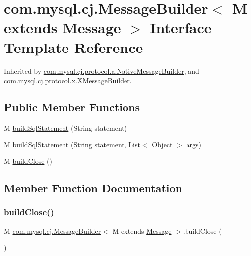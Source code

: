 \hypertarget{interfacecom_1_1mysql_1_1cj_1_1_message_builder}{}\section{com.\+mysql.\+cj.\+Message\+Builder$<$ M extends Message $>$ Interface Template Reference}
\label{interfacecom_1_1mysql_1_1cj_1_1_message_builder}


Inherited by \mbox{\hyperlink{classcom_1_1mysql_1_1cj_1_1protocol_1_1a_1_1_native_message_builder}{com.\+mysql.\+cj.\+protocol.\+a.\+Native\+Message\+Builder}}, and \mbox{\hyperlink{classcom_1_1mysql_1_1cj_1_1protocol_1_1x_1_1_x_message_builder}{com.\+mysql.\+cj.\+protocol.\+x.\+X\+Message\+Builder}}.

\subsection*{Public Member Functions}
\begin{DoxyCompactItemize}
\item 
M \mbox{\hyperlink{interfacecom_1_1mysql_1_1cj_1_1_message_builder_ab18c136ad40edd22c321cae8c222e6ad}{build\+Sql\+Statement}} (String statement)
\item 
M \mbox{\hyperlink{interfacecom_1_1mysql_1_1cj_1_1_message_builder_a592efa3bace2a15138d4bed34dd37e28}{build\+Sql\+Statement}} (String statement, List$<$ Object $>$ args)
\item 
M \mbox{\hyperlink{interfacecom_1_1mysql_1_1cj_1_1_message_builder_a8e2e854f8680445177dfb45482990c34}{build\+Close}} ()
\end{DoxyCompactItemize}


\subsection{Member Function Documentation}
\mbox{\label{interfacecom_1_1mysql_1_1cj_1_1_message_builder_a8e2e854f8680445177dfb45482990c34}} 
\subsubsection{\texorpdfstring{build\+Close()}{buildClose()}}
{\footnotesize\ttfamily M \mbox{\hyperlink{interfacecom_1_1mysql_1_1cj_1_1_message_builder}{com.\+mysql.\+cj.\+Message\+Builder}}$<$ M extends \mbox{\hyperlink{interfacecom_1_1mysql_1_1cj_1_1protocol_1_1_message}{Message}} $>$.build\+Close (\begin{DoxyParamCaption}{ }\end{DoxyParamCaption})}




